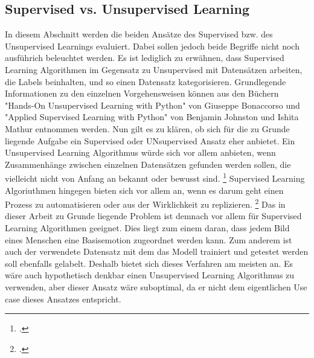\documentclass[12pt, a4paper]{scrbook}
\begin{document}
\subsection{Supervised vs. Unsupervised Learning}
In diesem Abschnitt werden die beiden Ansätze des Supervised bzw. des Unsupervised Learnings evaluiert. Dabei sollen jedoch beide Begriffe nicht noch ausführich beleuchtet werden. Es ist lediglich zu erwähnen, dass Supervised Learning Algorithmen im Gegensatz zu Unsupervised mit Datensätzen arbeiten, die Labels beinhalten, und so einen Datensatz kategorisieren.  Grundlegende Informationen zu den einzelnen Vorgehensweisen  können aus den Büchern "Hands-On Unsupervised Learning with Python" von Giuseppe Bonaccorso und "Applied Supervised Learning with Python" von Benjamin Johnston und Ishita Mathur entnommen werden.
Nun gilt es zu klären, ob sich für die zu Grunde liegende Aufgabe ein Supervised oder UNsupervised Ansatz eher anbietet. Ein Unsupervised Learning Algorithmus würde sich vor allem anbieten, wenn Zusammenhänge zwischen einzelnen Datensätzen gefunden werden sollen, die vielleicht nicht von Anfang an bekannt oder bewusst sind.
\footcite[Vgl. ][21]{Unsupervised}
 Supervised Learning Algoriuthmen hingegen bieten sich vor allem an, wenn es darum geht einen Prozess zu automatisieren oder aus der Wirklichkeit zu replizieren.
\footcite[Vgl. ][4]{Supervised}
Das in dieser Arbeit zu Grunde liegende Problem ist demnach vor allem für Supervised Learning Algorithmen geeignet. Dies liegt zum einem daran, dass jedem Bild eines Menschen eine Basisemotion zugeordnet werden kann. Zum anderem ist auch der verwendete Datensatz mit dem das Modell trainiert und getestet werden soll ebenfalls gelabelt. Deshalb bietet sich dieses Verfahren am meisten an. Es wäre auch hypothetisch denkbar einen Unsupervised Learning Algorithmus zu verwenden, aber dieser Ansatz wäre suboptimal, da er nicht dem eigentlichen Use case dieses Ansatzes entspricht.
\end{document}
